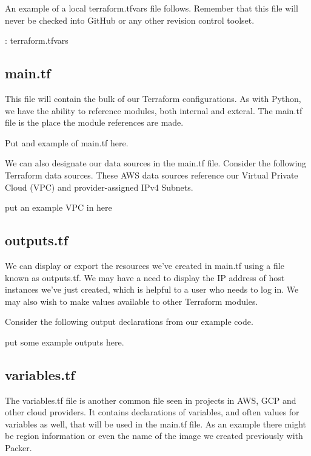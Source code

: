 \justify{}
An example of a local terraform.tfvars file follows. Remember that this
file will never be checked into GitHub or any other revision control
toolset.

\begin{mybox}{\thetcbcounter: terraform.tfvars}
  
\end{mybox}

\subsection{main.tf}

\justify{}
This file will contain the bulk of our Terraform configurations. As with
Python, we have the ability to reference modules, both internal and
exteral. The main.tf file is the place the module references are made.

Put and example of main.tf here.

\justify{}
We can also designate our data sources in the main.tf file. Consider the
following Terraform data sources. These AWS data sources reference our
Virtual Private Cloud (VPC) and provider-assigned IPv4 Subnets.

put an example VPC in here

\subsection{outputs.tf}

\justify{}
We can display or export the resources we've created in main.tf using a
file known as outputs.tf. We may have a need to display the IP address
of host instances we've just created, which is helpful to a user who
needs to log in. We may also wish to make values available to other
Terraform modules.

\justify{}
Consider the following output declarations from our example code.

put some example outputs here.

\subsection{variables.tf}

\justify{}
The variables.tf file is another common file seen in projects in AWS,
GCP and other cloud providers. It contains declarations of variables,
and often values for variables as well, that will be used in the main.tf
file. As an example there might be region information or even the name
of the image we created previously with Packer.

